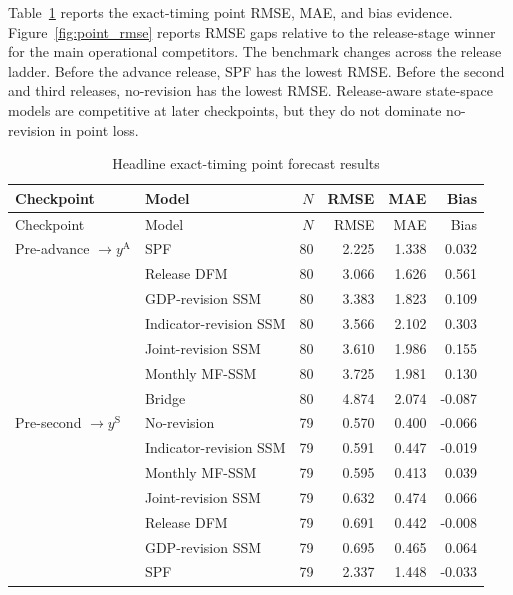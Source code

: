 \documentclass[12pt]{article}
\newcommand{\Arel}{\mathrm{A}}
\newcommand{\Srel}{\mathrm{S}}
\begin{document}
Table~\ref{tab:point_results} reports the exact-timing point RMSE, MAE, and bias evidence. Figure~\ref{fig:point_rmse} reports RMSE gaps relative to the release-stage winner for the main operational competitors. The benchmark changes across the release ladder. Before the advance release, SPF has the lowest RMSE. Before the second and third releases, no-revision has the lowest RMSE. Release-aware state-space models are competitive at later checkpoints, but they do not dominate no-revision in point loss.

\begingroup
\small
\setlength{\tabcolsep}{5pt}
\setlength{\LTleft}{\fill}
\setlength{\LTright}{\fill}

\begin{longtable}{llrrrr}
\caption{Headline exact-timing point forecast results}\label{tab:point_results}\\

\toprule
Checkpoint & Model & $N$ & RMSE & MAE & Bias \\
\midrule
\endfirsthead

\toprule
Checkpoint & Model & $N$ & RMSE & MAE & Bias \\
\midrule
\endhead

Pre-advance $\rightarrow y^{\Arel}$ & SPF & 80 & 2.225 & 1.338 & 0.032 \\
 & Release DFM & 80 & 3.066 & 1.626 & 0.561 \\
 & GDP-revision SSM & 80 & 3.383 & 1.823 & 0.109 \\
 & Indicator-revision SSM & 80 & 3.566 & 2.102 & 0.303 \\
 & Joint-revision SSM & 80 & 3.610 & 1.986 & 0.155 \\
 & Monthly MF-SSM & 80 & 3.725 & 1.981 & 0.130 \\
 & Bridge & 80 & 4.874 & 2.074 & -0.087 \\

\addlinespace
Pre-second $\rightarrow y^{\Srel}$ & No-revision & 79 & 0.570 & 0.400 & -0.066 \\
 & Indicator-revision SSM & 79 & 0.591 & 0.447 & -0.019 \\
 & Monthly MF-SSM & 79 & 0.595 & 0.413 & 0.039 \\
 & Joint-revision SSM & 79 & 0.632 & 0.474 & 0.066 \\
 & Release DFM & 79 & 0.691 & 0.442 & -0.008 \\
 & GDP-revision SSM & 79 & 0.695 & 0.465 & 0.064 \\
 & SPF & 79 & 2.337 & 1.448 & -0.033 \\


\end{longtable}
\end{document}

